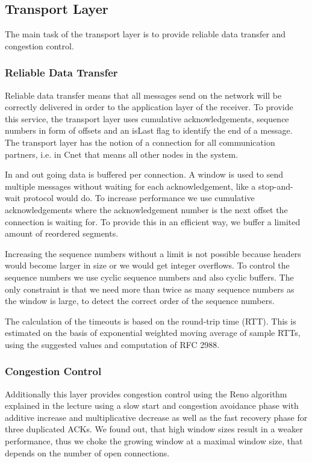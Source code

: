 \subsection{Transport Layer}
  The main task of the transport layer is to provide reliable data transfer and congestion control.

  \subsubsection{Reliable Data Transfer}
  Reliable data transfer means that all messages send on the network will be correctly delivered in order to the application layer of the receiver. To provide this service, the transport layer uses cumulative acknowledgements, sequence numbers in form of offsets and an isLast flag to identify the end of a message. The transport layer has the notion of a connection for all communication partners, i.e. in Cnet that means all other nodes in the system.
  
  In and out going data is buffered per connection. A window is used to send multiple messages without waiting for each acknowledgement, like a stop-and-wait protocol would do. To increase performance we use cumulative acknowledgements where the acknowledgement number is the next offset the connection is waiting for. To provide this in an efficient way, we buffer a limited amount of reordered segments.
  
  Increasing the sequence numbers without a limit is not possible because headers would become larger in size or we would get integer overflows. To control the sequence numbers we use cyclic sequence numbers and also cyclic buffers. The only constraint is that we need more than twice as many sequence numbers as the window is large, to detect the correct order of the sequence numbers.
  
  The calculation of the timeouts is based on the round-trip time (RTT). This is estimated on the basis of exponential weighted moving average of sample RTTs, using the suggested values and computation of RFC 2988.
  
  \subsubsection{Congestion Control}
  Additionally this layer provides congestion control using the Reno algorithm explained in the lecture using a slow start and congestion avoidance phase with additive increase and multiplicative decrease as well as the fast recovery phase for three duplicated ACKs. We found out, that high window sizes result in a weaker performance, thus we choke the growing window at a maximal window size, that depends on the number of open connections.
  
